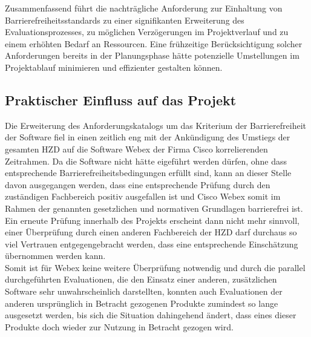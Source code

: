\documentclass[ThesisDJ.tex]{subfiles}
\begin{document}
Zusammenfassend führt die nachträgliche Anforderung zur Einhaltung von Barrierefreiheitsstandards zu einer signifikanten Erweiterung des Evaluationsprozesses, zu möglichen Verzögerungen im Projektverlauf und zu einem erhöhten Bedarf an Ressourcen. Eine frühzeitige Berücksichtigung solcher Anforderungen bereits in der Planungsphase hätte potenzielle Umstellungen im Projektablauf minimieren und effizienter gestalten können.

\subsection{Praktischer Einfluss auf das Projekt}
Die Erweiterung des Anforderungskatalogs um das Kriterium der Barrierefreiheit der Software fiel in einen zeitlich eng mit der Ankündigung des Umstiegs der gesamten HZD auf die Software Webex der Firma Cisco korrelierenden Zeitrahmen. Da die Software nicht hätte eigeführt werden dürfen, ohne dass entsprechende Barrierefreiheitsbedingungen erfüllt sind, kann an dieser Stelle davon ausgegangen werden, dass eine entsprechende Prüfung durch den zuständigen Fachbereich positiv ausgefallen ist und Cisco Webex somit im Rahmen der genannten gesetzlichen und normativen Grundlagen barrierefrei ist. Ein erneute Prüfung innerhalb des Projekts erscheint dann nicht mehr sinnvoll, einer Überprüfung durch einen anderen Fachbereich der HZD darf durchaus so viel Vertrauen entgegengebracht werden, dass eine entsprechende Einschätzung übernommen werden kann.\\
Somit ist für Webex keine weitere Überprüfung notwendig und durch die parallel durchgeführten Evaluationen, die den Einsatz einer anderen, zusätzlichen Software sehr unwahrscheinlich darstellten, konnten auch Evaluationen der anderen ursprünglich in Betracht gezogenen Produkte zumindest so lange ausgesetzt werden, bis sich die Situation dahingehend ändert, dass eines dieser Produkte doch wieder zur Nutzung in Betracht gezogen wird.
\end{document}
